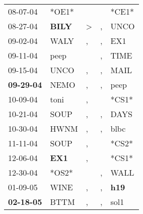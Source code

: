 \begin{supertabular}{p{0.07\textwidth}p{0.06\textwidth}p{0.02\textwidth}p{0.02\textwidth}p{0.06\textwidth}}
          08-07-04\textsuperscript{} &                            *OE1* &                  &                  &                            *CE1* \\
          08-27-04\textsuperscript{} &  \textbf{BILY\textsuperscript{}} &     \textgreater &                , &           UNCO\textsuperscript{} \\
          09-02-04\textsuperscript{} &           WALY\textsuperscript{} &                , &                , &            EX1\textsuperscript{} \\
          09-11-04\textsuperscript{} &           peep\textsuperscript{} &                  &                , &           TIME\textsuperscript{} \\
          09-15-04\textsuperscript{} &           UNCO\textsuperscript{} &                , &                , &           MAIL\textsuperscript{} \\
 \textbf{09-29-04\textsuperscript{}} &           NEMO\textsuperscript{} &                , &                , &           peep\textsuperscript{} \\
          10-09-04\textsuperscript{} &           toni\textsuperscript{} &                , &                  &                            *CS1* \\
          10-21-04\textsuperscript{} &           SOUP\textsuperscript{} &                , &                , &           DAYS\textsuperscript{} \\
          10-30-04\textsuperscript{} &           HWNM\textsuperscript{} &                , &                , &           blbc\textsuperscript{} \\
          11-11-04\textsuperscript{} &           SOUP\textsuperscript{} &                , &                  &                            *CS2* \\
          12-06-04\textsuperscript{} &   \textbf{EX1\textsuperscript{}} &                , &                  &                            *CS1* \\
          12-30-04\textsuperscript{} &                            *OS2* &                  &                , &           WALL\textsuperscript{} \\
          01-09-05\textsuperscript{} &           WINE\textsuperscript{} &                , &                , &   \textbf{h19\textsuperscript{}} \\
 \textbf{02-18-05\textsuperscript{}} &           BTTM\textsuperscript{} &                , &                , &           sol1\textsuperscript{} \\

\end{supertabular}
